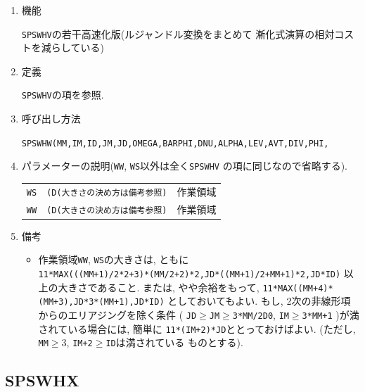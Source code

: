 \documentclass[a4j,fleqn]{jarticle}
\begin{document}
\begin{enumerate}

\item 機能

{\tt SPSWHV}の若干高速化版(ルジャンドル変換をまとめて
漸化式演算の相対コストを減らしている)

\item 定義

{\tt SPSWHV}の項を参照.

\item 呼び出し方法 

{\tt SPSWHW(MM,IM,ID,JM,JD,OMEGA,BARPHI,DNU,ALPHA,LEV,AVT,DIV,PHI,}\\
\hspace*{10em}{\tt DAVT,DDIV,DPHI,RN,IRM,IT,T,Y,IP,P,R,IA,A,Q,WS,WW)}
  
\item パラメーターの説明({\tt WW}, {\tt WS}以外は全く{\tt SPSWHV}
の項に同じなので省略する).

\begin{tabular}{lll}
{\tt WS}  & {\tt (D(大きさの決め方は備考参照)} & 作業領域\\
{\tt WW}  & {\tt (D(大きさの決め方は備考参照)} & 作業領域
\end{tabular}

\item 備考

\begin{itemize}

\item 作業領域{\tt WW}, {\tt WS}の大きさは, ともに\\
     {\tt 11*MAX(((MM+1)/2*2+3)*(MM/2+2)*2,JD*((MM+1)/2+MM+1)*2,JD*ID)}
    以上の大きさであること. または, やや余裕をもって,
     {\tt 11*MAX((MM+4)*(MM+3),JD*3*(MM+1),JD*ID)}
    としておいてもよい. もし, 2次の非線形項からのエリアジングを除く条件
     ( {\tt JD}$\ge${\tt JM}$\ge${\tt 3*MM/2D0}, 
      {\tt IM}$\ge${\tt 3*MM+1} )が満されている場合には, 簡単に
      {\tt 11*(IM+2)*JD}ととっておけばよい.
     (ただし, {\tt MM}$\ge 3$, {\tt IM+2}$\ge${\tt ID}は満されている
    ものとする).

\end{itemize}

\end{enumerate}


\subsection{SPSWHX}
\end{document}
